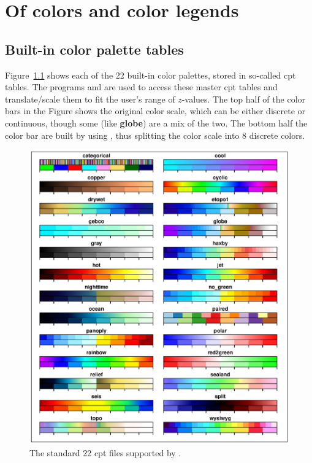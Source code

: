 %
%
\chapter{Of colors and color legends}
\label{app:M}
\section{Built-in color palette tables}
\thispagestyle{headings}

Figure~\ref{fig:GMT_App_M_1} shows each of the 22 built-in color palettes,
stored in so-called cpt tables.
The programs  and  are used to access these master cpt tables
and translate/scale them to fit the user's range of $z$-values.
The top half of the color bars in the Figure shows the original color scale, which can be either discrete or
continuous, though some (like \textbf{globe}) are a mix of the two.
The bottom half the color bar are built by using
 , thus splitting the color scale into 8 discrete colors.

\begin{figure}[h]
\centering
\includegraphics[width=\textwidth]{scripts/GMT_App_M_1}
\caption{The standard 22 cpt files supported by \gmt.}
\label{fig:GMT_App_M_1}
\end{figure}

